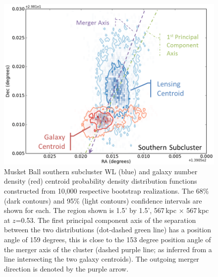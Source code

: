\begin{figure}
\centering
\includegraphics[width=5in]{Chapter4/AnalysisFiles/southcentroids_histplot2d_reformat.png}
\caption[Musket Ball southern subcluster galaxy and weak lensing centroid spatial distribution.]{
Musket Ball southern subcluster WL (blue) and galaxy number density (red) centroid probability density distribution functions constructed from 10,000 respective bootstrap realizations.
The 68\% (dark contours) and 95\% (light contours) confidence intervals are shown for each.
The region shown is 1.5' by 1.5', 567\,kpc $\times$ 567\,kpc at $z$=0.53.
The first principal component axis of the separation between the two distributions (dot-dashed green line) has a position angle of 159 degrees, this is close to the 153 degree position angle of the merger axis of the cluster (dashed purple line; as inferred from a line intersecting the two galaxy centroids).
The outgoing merger direction is denoted by the purple arrow.
}
\label{figure:CentroidDist_South}
\end{figure}


